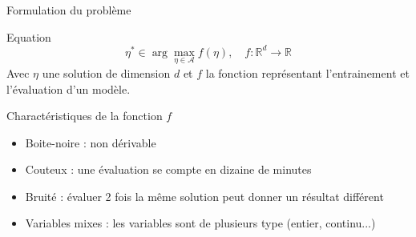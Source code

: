 \begin{frame}{Formulation du problème}
    \begin{block}{Equation}
        \begin{equation}
            \eta^* \in \arg \max_{\eta \in \mathcal A}f(\eta), \quad f:\mathbb{R}^d \rightarrow \mathbb{R}
        \end{equation}
        Avec $\eta$ une solution de dimension $d$ et $f$ la fonction représentant l'entrainement et l'évaluation d'un modèle.
    \end{block}

    \begin{block}{Charactéristiques de la fonction $f$}
        \begin{itemize}
            \item Boite-noire : non dérivable
            \item Couteux : une évaluation se compte en dizaine de minutes
            \item Bruité : évaluer 2 fois la même solution peut donner un résultat différent
            \item Variables mixes : les variables sont de plusieurs type (entier, continu...)
        \end{itemize}
        
    \end{block}
    
   
\end{frame}